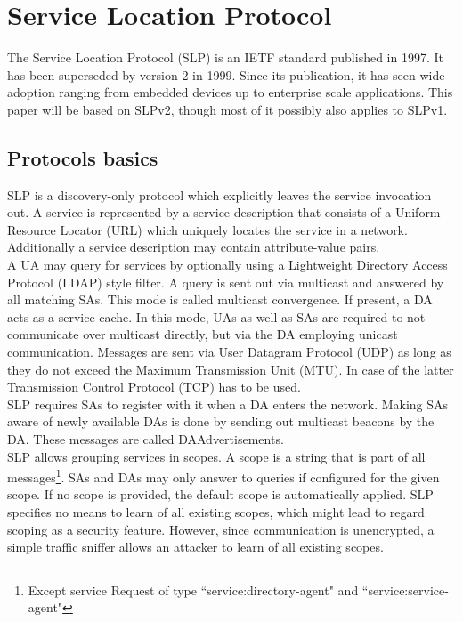 \section{Service Location Protocol}
The Service Location Protocol (SLP) is an IETF standard published in 1997. It has been superseded by version 2 \citep{Guttman1999} in 1999. Since its publication, it has seen wide adoption ranging from embedded devices up to enterprise scale applications. This paper will be based on SLPv2, though most of it possibly also applies to SLPv1.

\subsection{Protocols basics\label{sub:Protocols-basics}}
SLP is a discovery-only protocol which explicitly leaves the service invocation out. A service is represented by a service description that consists of a Uniform Resource Locator (URL) \citep{Berners-Lee1994} which uniquely locates the service in a network. Additionally a service description may contain attribute-value pairs.\\
A UA may query for services by optionally using a Lightweight Directory Access Protocol (LDAP) \citep{Howes1997} style filter. A query is sent out via multicast \citep{Armstrong1992} and answered by all matching SAs. This mode is called multicast convergence. If present, a DA acts as a service cache. In this mode, UAs as well as SAs are required to not communicate over multicast directly, but via the DA employing unicast communication. Messages are sent via User Datagram Protocol (UDP) as long as they do not exceed the Maximum Transmission Unit (MTU). In case of the latter Transmission Control Protocol (TCP) has to be used.\\
SLP requires SAs to register with it when a DA enters the network. Making SAs aware of newly available DAs is done by sending out multicast beacons by the DA. These messages are called DAAdvertisements.\\
SLP allows grouping services in scopes. A scope is a string that is part of all messages\footnote{Except service Request of type ``service:directory-agent" and ``service:service-agent"}. SAs and DAs may only answer to queries if configured for the given scope. If no scope is provided, the default scope is automatically applied. SLP specifies no means to learn of all existing scopes, which might lead to regard scoping as a security feature. However, since communication is unencrypted, a simple traffic sniffer allows an attacker to learn of all existing scopes.

